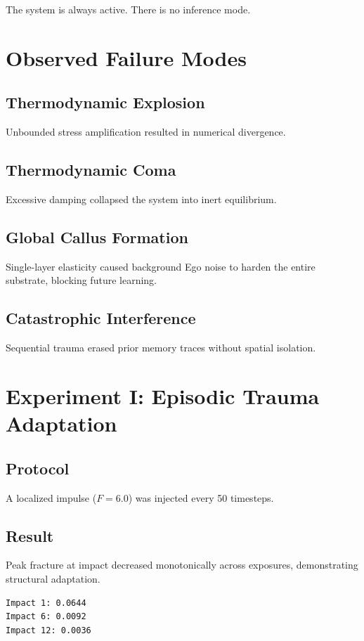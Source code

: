 \documentclass[11pt, a4paper]{article}
\begin{document}
The system is always active. There is no inference mode.

\section{Observed Failure Modes}

\subsection{Thermodynamic Explosion}
Unbounded stress amplification resulted in numerical divergence.

\subsection{Thermodynamic Coma}
Excessive damping collapsed the system into inert equilibrium.

\subsection{Global Callus Formation}
Single-layer elasticity caused background Ego noise to harden the entire substrate, blocking future learning.

\subsection{Catastrophic Interference}
Sequential trauma erased prior memory traces without spatial isolation.

\section{Experiment I: Episodic Trauma Adaptation}

\subsection{Protocol}
A localized impulse ($F=6.0$) was injected every 50 timesteps.

\subsection{Result}
Peak fracture at impact decreased monotonically across exposures, demonstrating structural adaptation.

\begin{lstlisting}
Impact 1: 0.0644
Impact 6: 0.0092
Impact 12: 0.0036
\end{lstlisting}
\end{document}
